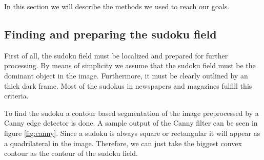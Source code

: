 \documentclass[
a4paper,     %
12pt         %
]{scrartcl}  %
\begin{document}
In this section we will describe the methods we used to reach our goals.

\subsection{Finding and preparing the sudoku field}
\label{sec:find}

First of all, the sudoku field must be localized and prepared for further
processing. By means of simplicity we assume that the sudoku field must be
the dominant object in the image. Furthermore, it must be clearly outlined by
an thick dark frame. Most of the sudokus in newspapers and magazines fulfill this
criteria.

To find the sudoku a contour based segmentation of the image preprocessed by
a Canny edge detector is done. A sample output of the Canny filter can be seen
in figure \ref{fig:canny}. Since a sudoku is always square or rectangular
it will appear as a quadrilateral in the image. Therefore, we can just take 
the biggest convex contour as the contour of the sudoku field.
\end{document}

